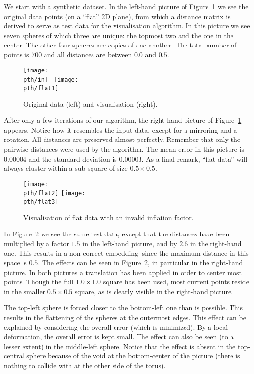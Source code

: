 \documentclass{article}
\theoremstyle{definition}
\begin{document}
We start with a synthetic dataset. In the left-hand picture of
Figure~\ref{to:fig:flat} we see the original data points (on a ``flat'' 2D plane),
from which a distance matrix is derived to serve as test data for the
visualisation algorithm. In this picture we see seven spheres of which three
are unique: the topmost two and the one in the center. The other four spheres
are copies of one another.  The total number of points is $700$ and all
distances are between $0.0$ and $0.5$.

\begin{figure}[!ht]
\texttt{[image: \\pth/in]}
\ \texttt{[image: \\pth/flat1]}
\caption{Original data (left) and visualisation (right).} \label{to:fig:flat}
\end{figure}

After only a few iterations of our algorithm, the right-hand picture of
Figure~\ref{to:fig:flat} appears. Notice how it resembles the input data, except
for a mirroring and a rotation. All distances are preserved almost perfectly.
Remember that only the pairwise distances were used by the algorithm. The mean
error in this picture is $0.00004$ and the standard deviation is $0.00003$. As
a final remark, ``flat data'' will always cluster within a sub-square of size
$0.5 \times 0.5$.

\begin{figure}[H]
\begin{center}
\texttt{[image: \\pth/flat2]}
\texttt{[image: \\pth/flat3]}
\caption{Visualisation of flat data with an invalid inflation factor.}
\end{center}
\label{to:fig:clusinv}
\end{figure}
In Figure~\ref{to:fig:clusinv} we see the same test data, except that the
distances have been multiplied by a factor $1.5$ in the left-hand picture, and
by $2.6$ in the right-hand one. This results in a non-correct embedding, since
the maximum distance in this space is $0.5$. The effects can be seen in
Figure~\ref{to:fig:clusinv}, in particular in the right-hand picture. In both
pictures a translation has been applied in order to center most points. Though
the full $1.0\times 1.0$ square has been used, most current points reside in
the smaller $0.5\times 0.5$ square, as is clearly visible in the right-hand
picture.

The top-left sphere is forced closer to the bottom-left one than is possible.
This results in the flattening of the spheres at the outermost edges. This
effect can be explained by considering the overall error (which is minimized).
By a local deformation, the overall error is kept small. The effect can also
be seen (to a lesser extent) in the middle-left sphere. Notice that the effect
is absent in the top-central sphere because of the void at the bottom-center of
the picture (there is nothing to collide with at the other side of the torus).
\end{document}
